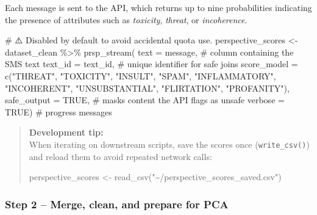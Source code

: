 \documentclass[
  letterpaper,
  DIV=11,
  numbers=noendperiod]{scrartcl}
\newenvironment{Shaded}{\begin{snugshade}}{\end{snugshade}}
\newcommand{\AttributeTok}[1]{\textcolor[rgb]{0.40,0.45,0.13}{#1}}
\newcommand{\CommentTok}[1]{\textcolor[rgb]{0.37,0.37,0.37}{#1}}
\newcommand{\ConstantTok}[1]{\textcolor[rgb]{0.56,0.35,0.01}{#1}}
\newcommand{\FunctionTok}[1]{\textcolor[rgb]{0.28,0.35,0.67}{#1}}
\newcommand{\NormalTok}[1]{\textcolor[rgb]{0.00,0.23,0.31}{#1}}
\newcommand{\OtherTok}[1]{\textcolor[rgb]{0.00,0.23,0.31}{#1}}
\newcommand{\SpecialCharTok}[1]{\textcolor[rgb]{0.37,0.37,0.37}{#1}}
\newcommand{\StringTok}[1]{\textcolor[rgb]{0.13,0.47,0.30}{#1}}
\begin{document}
\begin{tcolorbox}
Each message is sent to the API, which returns up to nine probabilities
indicating the presence of attributes such as \emph{toxicity},
\emph{threat}, or \emph{incoherence}.

\begin{Shaded}
\begin{Highlighting}[]
\CommentTok{\# ⚠️  Disabled by default to avoid accidental quota use.}
\NormalTok{perspective\_scores }\OtherTok{\textless{}{-}}\NormalTok{ dataset\_clean }\SpecialCharTok{\%\textgreater{}\%}
  \FunctionTok{prsp\_stream}\NormalTok{(}
    \AttributeTok{text        =}\NormalTok{ message,          }\CommentTok{\# column containing the SMS text}
    \AttributeTok{text\_id     =}\NormalTok{ text\_id,          }\CommentTok{\# unique identifier for safe joins}
    \AttributeTok{score\_model =} \FunctionTok{c}\NormalTok{(}\StringTok{"THREAT"}\NormalTok{, }\StringTok{"TOXICITY"}\NormalTok{, }\StringTok{"INSULT"}\NormalTok{, }\StringTok{"SPAM"}\NormalTok{,}
                    \StringTok{"INFLAMMATORY"}\NormalTok{, }\StringTok{"INCOHERENT"}\NormalTok{, }\StringTok{"UNSUBSTANTIAL"}\NormalTok{,}
                    \StringTok{"FLIRTATION"}\NormalTok{, }\StringTok{"PROFANITY"}\NormalTok{),}
    \AttributeTok{safe\_output =} \ConstantTok{TRUE}\NormalTok{,             }\CommentTok{\# masks content the API flags as unsafe}
    \AttributeTok{verbose     =} \ConstantTok{TRUE}\NormalTok{)             }\CommentTok{\# progress messages}
\end{Highlighting}
\end{Shaded}

\begin{quote}
\textbf{Development tip:}\\
When iterating on downstream scripts, save the scores once
(\texttt{write\_csv()}) and reload them to avoid repeated network calls:

\begin{Shaded}
\begin{Highlighting}[]
\NormalTok{perspective\_scores }\OtherTok{\textless{}{-}} \FunctionTok{read\_csv}\NormalTok{(}\StringTok{"\textasciitilde{}/perspective\_scores\_saved.csv"}\NormalTok{)}
\end{Highlighting}
\end{Shaded}
\end{quote}

\subsubsection{Step 2 -- Merge, clean, and prepare for
PCA}\label{step-2-merge-clean-and-prepare-for-pca}


\end{tcolorbox}
\end{document}
